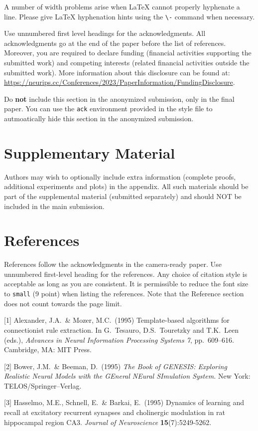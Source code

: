 \documentclass{article}
\begin{document}
\begin{CJK}{UTF8}{gbsn}
A number of width problems arise when \LaTeX{} cannot properly hyphenate a
line. Please give LaTeX hyphenation hints using the \verb+\-+ command when
necessary.


\begin{ack}
Use unnumbered first level headings for the acknowledgments. All acknowledgments
go at the end of the paper before the list of references. Moreover, you are required to declare
funding (financial activities supporting the submitted work) and competing interests (related financial activities outside the submitted work).
More information about this disclosure can be found at: \url{https://neurips.cc/Conferences/2023/PaperInformation/FundingDisclosure}.


Do {\bf not} include this section in the anonymized submission, only in the final paper. You can use the \texttt{ack} environment provided in the style file to autmoatically hide this section in the anonymized submission.
\end{ack}



\section{Supplementary Material}

Authors may wish to optionally include extra information (complete proofs, additional experiments and plots) in the appendix. All such materials should be part of the supplemental material (submitted separately) and should NOT be included in the main submission.


\section*{References}


References follow the acknowledgments in the camera-ready paper. Use unnumbered first-level heading for
the references. Any choice of citation style is acceptable as long as you are
consistent. It is permissible to reduce the font size to \verb+small+ (9 point)
when listing the references.
Note that the Reference section does not count towards the page limit.
\medskip


{
\small


[1] Alexander, J.A.\ \& Mozer, M.C.\ (1995) Template-based algorithms for
connectionist rule extraction. In G.\ Tesauro, D.S.\ Touretzky and T.K.\ Leen
(eds.), {\it Advances in Neural Information Processing Systems 7},
pp.\ 609--616. Cambridge, MA: MIT Press.


[2] Bower, J.M.\ \& Beeman, D.\ (1995) {\it The Book of GENESIS: Exploring
  Realistic Neural Models with the GEneral NEural SImulation System.}  New York:
TELOS/Springer--Verlag.


[3] Hasselmo, M.E., Schnell, E.\ \& Barkai, E.\ (1995) Dynamics of learning and
recall at excitatory recurrent synapses and cholinergic modulation in rat
hippocampal region CA3. {\it Journal of Neuroscience} {\bf 15}(7):5249-5262.
}



\end{CJK}
\end{document}

